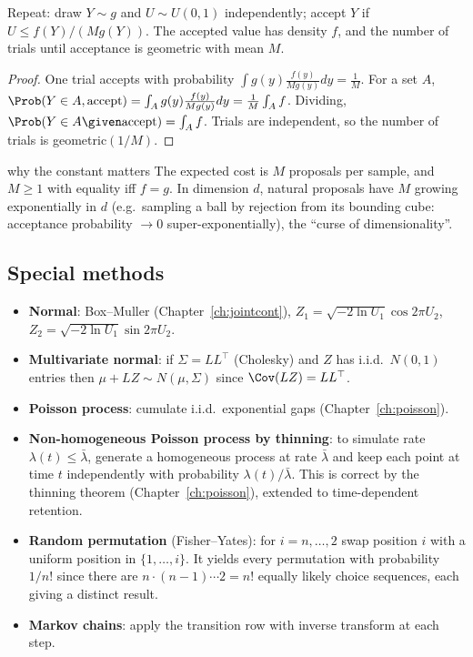 \begin{theorem}\label{thm:reject}
Repeat: draw $Y\sim g$ and $U\sim U(0,1)$ independently; accept $Y$ if $U\le f(Y)/(Mg(Y))$.
The accepted value has density $f$, and the number of trials until acceptance is
geometric with mean $M$.
\end{theorem}
\begin{proof}
One trial accepts with probability
$\int g(y)\frac{f(y)}{Mg(y)}dy=\frac1M$. For a set $A$,
$\Prob(Y\in A,\text{accept})=\int_Ag(y)\frac{f(y)}{Mg(y)}dy=\frac1M\int_Af$. Dividing,
$\Prob(Y\in A\given\text{accept})=\int_Af$. Trials are independent, so the number of trials is
geometric$(1/M)$.
\end{proof}

\begin{nuance}{why the constant matters}
The expected cost is $M$ proposals per sample, and $M\ge1$ with equality iff $f=g$. In
dimension $d$, natural proposals have $M$ growing exponentially in $d$ (e.g.\ sampling a
ball by rejection from its bounding cube: acceptance probability $\to0$ super-exponentially),
the ``curse of dimensionality''.
\end{nuance}

\subsection{Special methods}

\begin{itemize}
\item \textbf{Normal}: Box--Muller (Chapter~\ref{ch:jointcont}), $Z_1=\sqrt{-2\ln U_1}\cos2\pi U_2$,
$Z_2=\sqrt{-2\ln U_1}\sin2\pi U_2$.
\item \textbf{Multivariate normal}: if $\Sigma=LL^\top$ (Cholesky) and $Z$ has i.i.d.\ $N(0,1)$ entries then
$\mu+LZ\sim N(\mu,\Sigma)$ since $\Cov(LZ)=LL^\top$.
\item \textbf{Poisson process}: cumulate i.i.d.\ exponential gaps (Chapter~\ref{ch:poisson}).
\item \textbf{Non-homogeneous Poisson process by thinning}: to simulate rate $\lambda(t)\le\bar\lambda$,
generate a homogeneous process at rate $\bar\lambda$ and keep each point at time $t$
independently with probability $\lambda(t)/\bar\lambda$. This is correct by the thinning
theorem (Chapter~\ref{ch:poisson}), extended to time-dependent retention.
\item \textbf{Random permutation} (Fisher--Yates): for $i=n,\dots,2$ swap position $i$ with a uniform
position in $\{1,\dots,i\}$. It yields every permutation with probability $1/n!$ since there are
$n\cdot(n-1)\cdots2=n!$ equally likely choice sequences, each giving a distinct result.
\item \textbf{Markov chains}: apply the transition row with inverse transform at each step.
\end{itemize}

